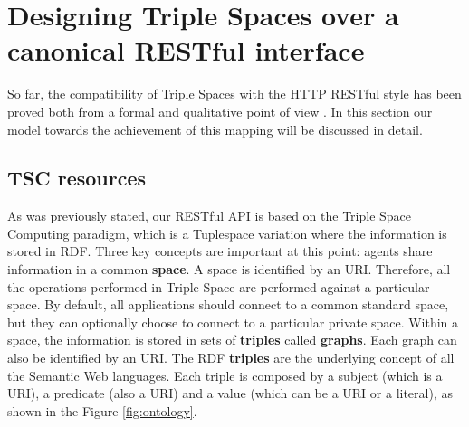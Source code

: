







\section{Designing Triple Spaces over a canonical RESTful interface}

So far, the compatibility of Triple Spaces with the HTTP RESTful style has been proved both from a formal \citep{hernandez_formal_2010} and qualitative point of view \citep{gomez-goiri_complementarity_2011}.
In this section our model towards the achievement of this mapping will be discussed in detail.

\subsection{TSC resources}

As was previously stated, our RESTful API is based on the Triple Space Computing paradigm, which is a Tuplespace variation where the information is stored in RDF.
Three key concepts are important at this point: agents share information in a common \textbf{space}.
A space is identified by an URI.
Therefore, all the operations performed in Triple Space are performed against a particular space.
By default, all applications should connect to a common standard space, but they can optionally choose to connect to a particular private space.
Within a space, the information is stored in sets of \textbf{triples} called \textbf{graphs}.
Each graph can also be identified by an URI. The RDF \textbf{triples} are the underlying concept of all the Semantic Web languages.
Each triple is composed by a subject (which is a URI), a predicate (also a URI) and a value (which can be a URI or a literal), as shown in the Figure \ref{fig:ontology}.

